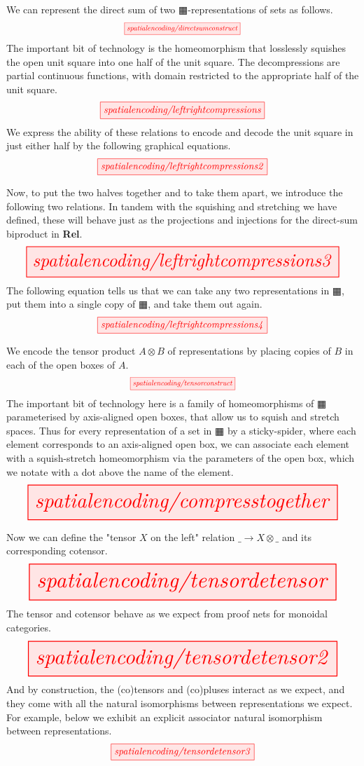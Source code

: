 \begin{construction}
We can represent the direct sum of two $\squarehvfill$-representations of sets as follows.
\[\scalebox{0.75}{\tikzfig{spatialencoding/directsumconstruct}}\]
The important bit of technology is the homeomorphism that losslessly squishes the open unit square into one half of the unit square. The decompressions are partial continuous functions, with domain restricted to the appropriate half of the unit square.
\[\scalebox{1}{\tikzfig{spatialencoding/leftrightcompressions}}\]
We express the ability of these relations to encode and decode the unit square in just either half by the following graphical equations.
\[\scalebox{1}{\tikzfig{spatialencoding/leftrightcompressions2}}\]
\end{construction}
Now, to put the two halves together and to take them apart, we introduce the following two relations. In tandem with the squishing and stretching we have defined, these will behave just as the projections and injections for the direct-sum biproduct in \textbf{Rel}.
\[\resizebox{\textwidth}{!}{\tikzfig{spatialencoding/leftrightcompressions3}}\]
The following equation tells us that we can take any two representations in $\squarehvfill$, put them into a single copy of $\squarehvfill$, and take them out again.
\[\scalebox{1}{\tikzfig{spatialencoding/leftrightcompressions4}}\]

We encode the tensor product $A \otimes B$ of representations by placing copies of $B$ in each of the open boxes of $A$.
\[\scalebox{0.75}{\tikzfig{spatialencoding/tensorconstruct}}\]
The important bit of technology here is a family of homeomorphisms of $\squarehvfill$ parameterised by axis-aligned open boxes, that allow us to squish and stretch spaces. Thus for every representation of a set in $\squarehvfill$ by a sticky-spider, where each element corresponds to an axis-aligned open box, we can associate each element with a squish-stretch homeomorphism via the parameters of the open box, which we notate with a dot above the name of the element.
\[\resizebox{\textwidth}{!}{\tikzfig{spatialencoding/compresstogether}}\]

Now we can define the "tensor $X$ on the left" relation $\_ \rightarrow X \otimes \_$ and its corresponding cotensor.
\[\resizebox{\textwidth}{!}{\tikzfig{spatialencoding/tensordetensor}}\]
The tensor and cotensor behave as we expect from proof nets for monoidal categories.
\[\resizebox{\textwidth}{!}{\tikzfig{spatialencoding/tensordetensor2}}\]
And by construction, the (co)tensors and (co)pluses interact as we expect, and they come with all the natural isomorphisms between representations we expect. For example, below we exhibit an explicit associator natural isomorphism between representations.
\[\scalebox{1}{\tikzfig{spatialencoding/tensordetensor3}}\]

